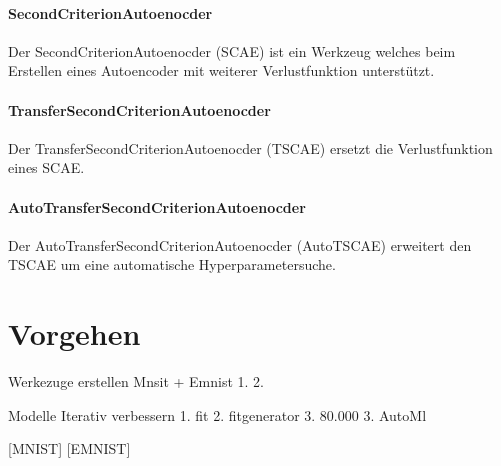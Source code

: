 	\paragraph{SecondCriterionAutoenocder} Der SecondCriterionAutoenocder (SCAE) ist ein Werkzeug welches beim Erstellen eines Autoencoder mit weiterer Verlustfunktion unterstützt.  
    \paragraph{TransferSecondCriterionAutoenocder} Der TransferSecondCriterionAutoenocder (TSCAE) ersetzt die Verlustfunktion eines SCAE.
 	\paragraph{AutoTransferSecondCriterionAutoenocder} Der AutoTransferSecondCriterionAutoenocder (AutoTSCAE) erweitert den TSCAE um eine automatische Hyperparametersuche. 
  		
	\section{Vorgehen}
	\label{sec:Vorgehen}
	Werkezuge erstellen Mnsit + Emnist
	 1.
	 2.
	 
	Modelle Iterativ verbessern
		1. fit
		2. fitgenerator
		3. 80.000	
	3. AutoMl
		
	
	
	[MNIST] [EMNIST]
	



